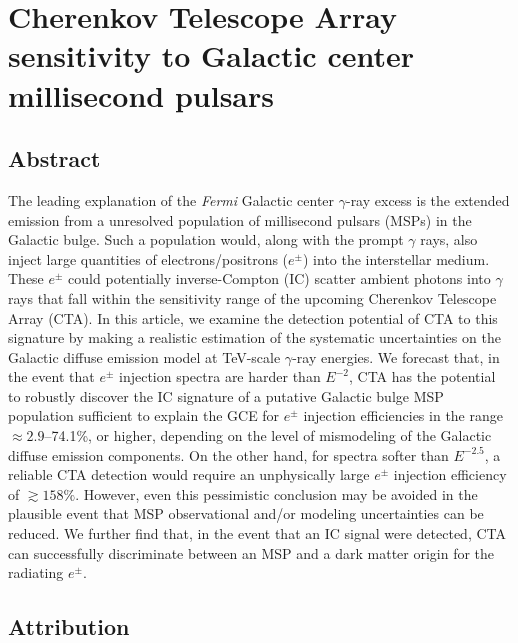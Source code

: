 \documentclass[doublespace,nopageskip]{VTthesis} %
\begin{document}
\chapter{Cherenkov Telescope Array sensitivity to Galactic center millisecond pulsars}\label{ch:CTA}

\section{Abstract}

The leading explanation of the \textit{Fermi} Galactic center $\gamma$-ray excess is the extended emission from a unresolved population of millisecond
pulsars (MSPs) in the Galactic bulge. Such a population would, along with the prompt $\gamma$ rays, also inject large quantities of electrons/positrons ($e^\pm$) into the interstellar medium. These $e^\pm$ could potentially inverse-Compton (IC) scatter ambient photons into $\gamma$ rays that fall within the sensitivity range of the upcoming Cherenkov Telescope Array (CTA). In this article, we examine the detection potential of CTA to this signature by making a realistic estimation of the systematic uncertainties on the Galactic diffuse emission model at TeV-scale $\gamma$-ray energies. We forecast that, in the event that $e^\pm$ injection spectra are harder than $E^{-2}$, CTA has the potential to robustly discover the IC signature of 
a putative Galactic bulge MSP population sufficient to explain the GCE for $e^\pm$ injection efficiencies in the range $\approx 2.9$--74.1\%, or higher, depending on the level of mismodeling of the Galactic diffuse emission components. On the other hand, for spectra softer than $E^{-2.5}$, a reliable CTA detection would require an unphysically large $e^\pm$ injection efficiency of $\gtrsim 158\%$. However, even this pessimistic conclusion may be avoided in the plausible event that
MSP observational and/or modeling uncertainties can be reduced. We further find that, in the event that an IC signal were detected, CTA can successfully discriminate between an MSP and a dark matter origin for the radiating $e^\pm$.

\section{Attribution}
\end{document}
